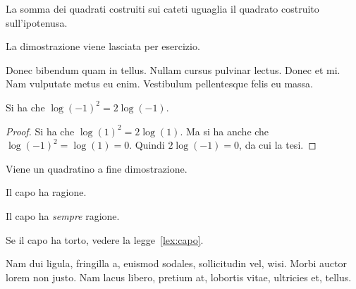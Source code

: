 \lipsum[2]

\begin{teorema}[di Pitagora]
La somma dei quadrati costruiti sui cateti uguaglia il quadrato costruito sull'ipotenusa.
\end{teorema}
La dimostrazione viene lasciata per esercizio.

Donec bibendum quam in tellus. Nullam cursus pulvinar lectus. Donec et mi. Nam vulputate metus eu enim. Vestibulum pellentesque felis eu massa.
\begin{teorema}[Sorpresa]
Si ha che $\log(-1)^2=2\log(-1)$.
\end{teorema} 
\begin{proof} 
Si ha che $\log(1)^2 = 2\log(1)$.
Ma si ha anche che $\log(-1)^2=\log(1)=0$.
Quindi $2\log(-1)=0$, da cui la tesi.
\end{proof}
Viene un quadratino a fine dimostrazione.
\begin{legge}
\label{lex:capo}
Il capo ha ragione.
\end{legge}
\begin{decreto}
Il capo ha \emph{sempre} ragione.
\end{decreto}
\begin{legge}
Se il capo ha torto, vedere la 
legge~\ref{lex:capo}.
\end{legge}


Nam dui ligula, fringilla a, euismod sodales, sollicitudin vel, wisi. Morbi auctor lorem non justo. Nam lacus libero, pretium at, lobortis vitae, ultricies et, tellus.
